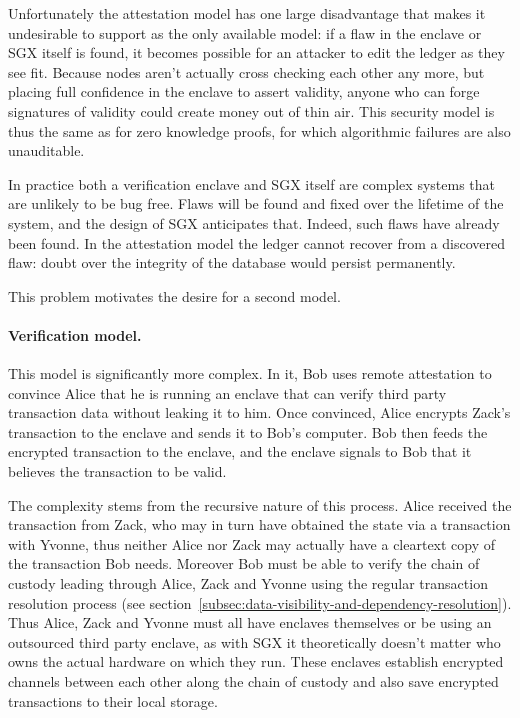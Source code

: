 \documentclass{article}
\begin{document}
Unfortunately the attestation model has one large disadvantage that makes it undesirable to support as the
only available model: if a flaw in the enclave or SGX itself is found, it becomes possible for an attacker to edit
the ledger as they see fit. Because nodes aren't actually cross checking each other any more, but placing full
confidence in the enclave to assert validity, anyone who can forge signatures of validity could create money out of
thin air. This security model is thus the same as for zero knowledge proofs, for which algorithmic failures are
also unauditable.

In practice both a verification enclave and SGX itself are complex systems that are unlikely to be bug free. Flaws
will be found and fixed over the lifetime of the system, and the design of SGX anticipates that. Indeed, such flaws
have already been found. In the attestation model the ledger cannot recover from a discovered flaw: doubt over
the integrity of the database would persist permanently.

This problem motivates the desire for a second model.

\paragraph{Verification model.}This model is significantly more complex. In it, Bob uses remote attestation to
convince Alice that he is running an enclave that can verify third party transaction data without leaking it to
him. Once convinced, Alice encrypts Zack's transaction to the enclave and sends it to Bob's computer. Bob then
feeds the encrypted transaction to the enclave, and the enclave signals to Bob that it believes the transaction to
be valid.

The complexity stems from the recursive nature of this process. Alice received the transaction from Zack, who may
in turn have obtained the state via a transaction with Yvonne, thus neither Alice nor Zack may actually have a
cleartext copy of the transaction Bob needs. Moreover Bob must be able to verify the chain of custody leading
through Alice, Zack and Yvonne using the regular transaction resolution process
(see section~\cref{subsec:data-visibility-and-dependency-resolution}). Thus Alice, Zack and Yvonne must all have
enclaves themselves or be using an outsourced third party enclave, as with SGX it theoretically doesn't matter
who owns the actual hardware on which they run. These enclaves establish encrypted channels between each other
along the chain of custody and also save encrypted transactions to their local storage.
\end{document}
